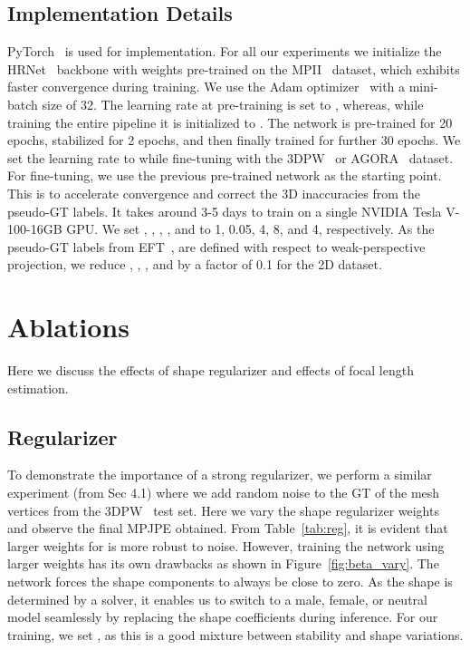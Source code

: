 \documentclass[10pt,twocolumn,letterpaper]{article}
\begin{document}
\subsection{Implementation Details}
PyTorch~\cite{pytorch} is used for implementation. For all our experiments we initialize the HRNet~\cite{hrnet} backbone with weights pre-trained on the MPII~\cite{mpii} dataset, which exhibits faster convergence during training. We use the Adam optimizer~\cite{adam} with a mini-batch size of 32. The learning rate at pre-training is set to , whereas, while training the entire pipeline it is initialized to . The network is pre-trained for 20 epochs, stabilized for 2 epochs, and then finally trained for further 30 epochs. We set the learning rate to  while fine-tuning with the 3DPW~\cite{3dpw} or AGORA~\cite{agora} dataset. For fine-tuning, we use the previous pre-trained network as the starting point. This is to accelerate convergence and correct the 3D inaccuracies from the pseudo-GT labels.
It takes around 3-5 days to train on a single NVIDIA Tesla V-100-16GB GPU. We set , , , , and  to 1, 0.05, 4, 8, and 4, respectively. As the pseudo-GT labels from EFT~\cite{eft}, are defined with respect to weak-perspective projection, we reduce , , , and  by a factor of 0.1 for the 2D dataset. 


\section{Ablations}
Here we discuss the effects of shape regularizer and effects of focal length estimation.

\subsection{Regularizer}
To demonstrate the importance of a strong regularizer, we perform a similar experiment (from Sec 4.1) where we add random noise to the GT of the mesh vertices from the 3DPW~\cite{3dpw} test set. Here we vary the shape regularizer weights  and observe the final MPJPE obtained. From Table~\ref{tab:reg}, it is evident that larger weights for  is more robust to noise. However, training the network using larger weights has its own drawbacks as shown in Figure~\ref{fig:beta_vary}. The network forces the shape components  to always be close to zero. 
As the shape  is determined by a solver, it enables us to switch to a male, female, or neutral model seamlessly by replacing the shape coefficients  during inference. For our training, we set , as this is a good mixture between stability and shape variations.
\end{document}
